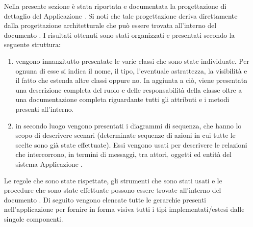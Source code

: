    Nella presente sezione è stata riportata e documentata la progettazione di dettaglio del  Applicazione . Si noti che tale progettazione deriva direttamente dalla progettazione architetturale che può essere trovata all'interno del documento . I risultati ottenuti sono stati organizzati e presentati secondo la seguente struttura:
    \begin{enumerate}
        \item vengono innanzitutto presentate le varie classi che sono state individuate. Per ognuna di esse si indica il nome, il tipo, l'eventuale astrattezza, la visibilità e il fatto che estenda altre classi oppure no. In aggiunta a ciò, viene presentata una descrizione completa del ruolo e delle responsabilità della classe oltre a una documentazione completa riguardante tutti gli attributi e i metodi presenti all'interno.
        \item in secondo luogo vengono presentati i diagrammi di sequenza, che hanno lo scopo di descrivere scenari (determinate sequenze di azioni in cui tutte le scelte sono già state effettuate). Essi vengono usati per descrivere le relazioni che intercorrono, in termini di messaggi, tra attori, oggetti ed entità del sistema Applicazione .
    \end{enumerate}
    Le regole che sono state rispettate, gli strumenti che sono stati usati e le procedure che sono state effettuate possono essere trovate all'interno del documento .
            Di seguito vengono elencate tutte le gerarchie presenti nell'applicazione  per fornire in forma visiva tutti i tipi implementati/estesi dalle singole componenti.
